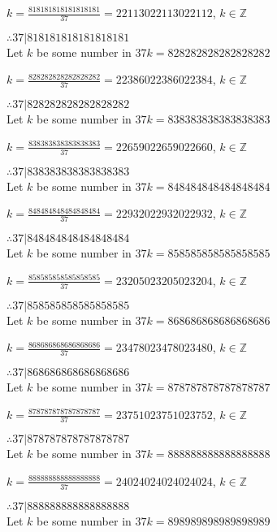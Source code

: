 \documentclass{article}
\begin{document}
$k = \frac{818181818181818181}{37} = 22113022113022112$, $k \in \mathbb{Z}$

$ \therefore  37|818181818181818181 $ \\

Let $k$ be some number in $37k = 828282828282828282$

$k = \frac{828282828282828282}{37} = 22386022386022384$, $k \in \mathbb{Z}$

$ \therefore  37|828282828282828282 $ \\

Let $k$ be some number in $37k = 838383838383838383$

$k = \frac{838383838383838383}{37} = 22659022659022660$, $k \in \mathbb{Z}$

$ \therefore  37|838383838383838383 $ \\

Let $k$ be some number in $37k = 848484848484848484$

$k = \frac{848484848484848484}{37} = 22932022932022932$, $k \in \mathbb{Z}$

$ \therefore  37|848484848484848484 $ \\

Let $k$ be some number in $37k = 858585858585858585$

$k = \frac{858585858585858585}{37} = 23205023205023204$, $k \in \mathbb{Z}$

$ \therefore  37|858585858585858585 $ \\

Let $k$ be some number in $37k = 868686868686868686$

$k = \frac{868686868686868686}{37} = 23478023478023480$, $k \in \mathbb{Z}$

$ \therefore  37|868686868686868686 $ \\

Let $k$ be some number in $37k = 878787878787878787$

$k = \frac{878787878787878787}{37} = 23751023751023752$, $k \in \mathbb{Z}$

$ \therefore  37|878787878787878787 $ \\

Let $k$ be some number in $37k = 888888888888888888$

$k = \frac{888888888888888888}{37} = 24024024024024024$, $k \in \mathbb{Z}$

$ \therefore  37|888888888888888888 $ \\

Let $k$ be some number in $37k = 898989898989898989$
\end{document}
